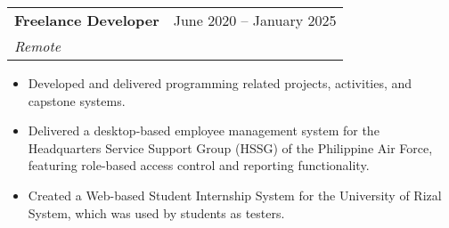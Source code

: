 \documentclass[legal,10pt]{article}
\makeatletter
\newcommand{\resumeItem}[1]{
  \item\small{
    {#1 \vspace{-2pt}}
  }
}
\newcommand{\resumeSubheading}[4]{
  \vspace{-2pt}\item
    \begin{tabular*}{0.97\textwidth}[t]{l@{\extracolsep{\fill}}r}
      \textbf{#1} & #2 \\
      \textit{\small#3} & \textit{\small #4} \\
    \end{tabular*}\vspace{-7pt}
}
\newcommand{\resumeSubSubheading}[2]{
    \item
    \begin{tabular*}{0.97\textwidth}{l@{\extracolsep{\fill}}r}
      \textit{\small#1} & \textit{\small #2} \\
    \end{tabular*}\vspace{-7pt}
}
\newcommand{\resumeSubHeadingListEnd}{\end{itemize}}
\newcommand{\resumeItemListStart}{\begin{itemize}}
\newcommand{\resumeItemListEnd}{\end{itemize}\vspace{-5pt}}
\makeatother
\begin{document}
    \resumeSubheading
      {Freelance Developer}{June 2020 -- January 2025}
      {Remote}{}
      \resumeItemListStart
        \resumeItem{Developed and delivered programming related projects, activities, and capstone systems.}
        \resumeItem{Delivered a desktop-based employee management system for the Headquarters Service Support Group (HSSG) of the Philippine Air Force, featuring role-based access control and reporting functionality.}
        \resumeItem{Created a Web-based Student Internship System for the University of Rizal System, which was used by students as testers.}
      \resumeItemListEnd




    

    
\end{document}
